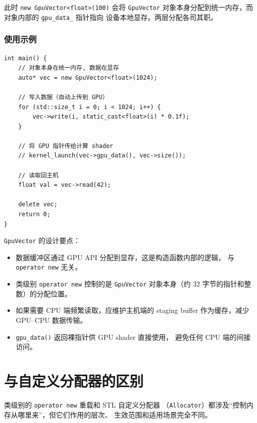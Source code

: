 \documentclass[12pt,a4paper,fontset=fandol]{ctexbook}
\begin{document}
此时 \texttt{new GpuVector<float>(100)} 会将 \texttt{GpuVector}
对象本身分配到统一内存，而对象内部的 \texttt{gpu\_data\_} 指针指向
设备本地显存。两层分配各司其职。

\subsection{使用示例}

\begin{lstlisting}
int main() {
    // 对象本身在统一内存, 数据在显存
    auto* vec = new GpuVector<float>(1024);

    // 写入数据（自动上传到 GPU）
    for (std::size_t i = 0; i < 1024; i++) {
        vec->write(i, static_cast<float>(i) * 0.1f);
    }

    // 将 GPU 指针传给计算 shader
    // kernel_launch(vec->gpu_data(), vec->size());

    // 读取回主机
    float val = vec->read(42);

    delete vec;
    return 0;
}
\end{lstlisting}

\begin{guideline}
\texttt{GpuVector} 的设计要点：
\begin{itemize}
    \item 数据缓冲区通过 GPU API 分配到显存，这是构造函数内部的逻辑，
          与 \texttt{operator new} 无关。
    \item 类级别 \texttt{operator new} 控制的是 \texttt{GpuVector}
          对象本身（约 32 字节的指针和整数）的分配位置。
    \item 如果需要 CPU 端频繁读取，应维护主机端的 staging buffer
          作为缓存，减少 GPU--CPU 数据传输。
    \item \texttt{gpu\_data()} 返回裸指针供 GPU shader 直接使用，
          避免任何 CPU 端的间接访问。
\end{itemize}
\end{guideline}

\chapter{与自定义分配器的区别}

类级别的 \texttt{operator new} 重载和 STL 自定义分配器
（\texttt{Allocator}）都涉及``控制内存从哪里来''，但它们作用的层次、
生效范围和适用场景完全不同。
\end{document}
